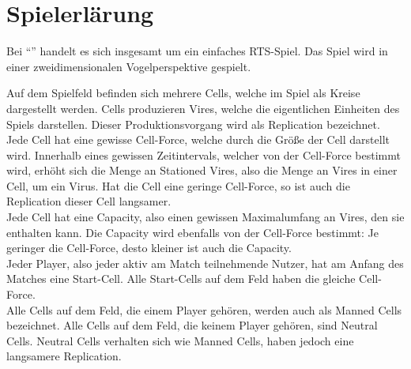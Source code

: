 \section{Spielerlärung}
\label{sec:spielerklaerung}

Bei ``\vires'' handelt es sich insgesamt um ein einfaches RTS-Spiel. 
Das Spiel wird in einer zweidimensionalen Vogelperspektive gespielt.

Auf dem Spielfeld befinden sich mehrere Cells, welche im Spiel als Kreise dargestellt werden.
Cells produzieren Vires, welche die eigentlichen Einheiten des Spiels darstellen. Dieser Produktionsvorgang wird als Replication bezeichnet. \\
Jede Cell hat eine gewisse Cell-Force, welche durch die Größe der Cell darstellt wird.
Innerhalb eines gewissen Zeitintervals, welcher von der Cell-Force bestimmt wird, erhöht sich die Menge an Stationed Vires, also die Menge an Vires in einer Cell, um ein Virus.
Hat die Cell eine geringe Cell-Force, so ist auch die Replication dieser Cell langsamer. \\
Jede Cell hat eine Capacity, also einen gewissen Maximalumfang an Vires, den sie enthalten kann.
Die Capacity wird ebenfalls von der Cell-Force bestimmt: Je geringer die Cell-Force, desto kleiner ist auch die Capacity. \\
Jeder Player, also jeder aktiv am Match teilnehmende Nutzer, hat am Anfang des Matches eine Start-Cell. 
Alle Start-Cells auf dem Feld haben die gleiche Cell-Force. \\
Alle Cells auf dem Feld, die einem Player gehören, werden auch als Manned Cells bezeichnet.
Alle Cells auf dem Feld, die keinem Player gehören, sind Neutral Cells. Neutral Cells verhalten sich wie Manned Cells, haben jedoch eine langsamere Replication.

